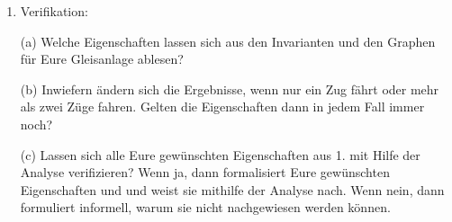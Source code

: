 \documentclass{scrreprt}
\begin{document}
\begin{enumerate}
\newpage

\item Verifikation:

(a) Welche Eigenschaften lassen sich aus den Invarianten und den Graphen für Eure Gleisanlage ablesen?


(b) Inwiefern ändern sich die Ergebnisse, wenn nur ein Zug fährt oder mehr als zwei Züge fahren. Gelten die Eigenschaften dann in jedem Fall immer noch?


(c) Lassen sich alle Eure gewünschten Eigenschaften aus 1. mit Hilfe der Analyse verifizieren? Wenn ja, dann formalisiert Eure gewünschten Eigenschaften und
    und weist sie mithilfe der Analyse nach. Wenn nein, dann formuliert informell, warum sie nicht nachgewiesen werden können.


\end{enumerate}
\end{document}

